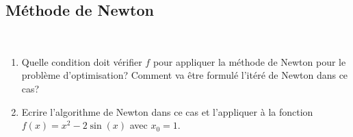 \subsection{Méthode de Newton}\label{exo:2}

\begin{td-exo}\,
    \begin{enumerate}
        \item Quelle condition doit vérifier \(f\) pour appliquer la méthode de Newton
        pour le problème d'optimisation? Comment va être formulé l'itéré de Newton dans ce cas?

        \item Ecrire l'algorithme de Newton dans ce cas et l'appliquer à la fonction 
        \(f(x) = x^2 - 2\sin(x)\) avec \(x_0 = 1\).
    \end{enumerate}
\end{td-exo}

